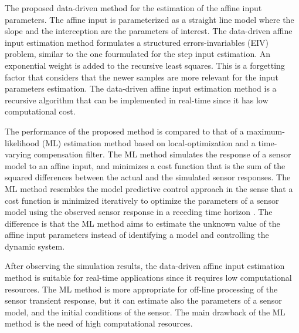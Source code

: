 The proposed data-driven method for the estimation of the affine input parameters.
The affine input is parameterized as a straight line model where the slope and the interception are the parameters of interest.
The data-driven affine input estimation method formulates a structured errors-invariables (EIV) problem, similar to the one fourmulated for the step input estimation.
An exponential weight is added to the recursive least squares.
This is a forgetting factor that considers that the newer samples are more relevant for the input parameters estimation.
The data-driven affine input estimation method is a recursive algorithm that can be implemented in real-time since it has low computational cost.

The performance of the proposed method is compared to that of a maximum-likelihood (ML) estimation method based on local-optimization and a time-varying compensation filter.
The ML method simulates the response of a sensor model to an affine input, and minimizes a cost function that is the sum of the squared differences between the actual and the simulated sensor responses. 
The ML method resembles the model predictive control approach in the sense that a cost function is minimized iteratively to optimize the parameters of a sensor model using the observed sensor response in a receding time horizon \citep{Mayne14}.
The difference is that the ML method aims to estimate the unknown value of the affine input parameters instead of identifying a model and controlling the dynamic system. 
 
After observing the simulation results, the data-driven affine input estimation method is suitable for real-time applications since it requires low computational resources. 
The ML method is more appropriate for off-line processing of the sensor transient response, but
it can estimate also the parameters of a sensor model, and the initial conditions of the sensor.
The main drawback of the ML method is the need of high computational resources.


 
\newpage
